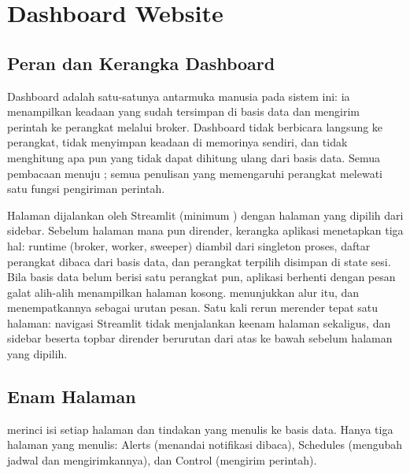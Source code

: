 \chapter{Dashboard Website}
\label{ch:05-website}

\section{Peran dan Kerangka Dashboard}

Dashboard adalah satu-satunya antarmuka manusia pada sistem ini: ia menampilkan
keadaan yang sudah tersimpan di basis data dan mengirim perintah ke perangkat
melalui broker. Dashboard tidak berbicara langsung ke perangkat, tidak menyimpan
keadaan di memorinya sendiri, dan tidak menghitung apa pun yang tidak dapat
dihitung ulang dari basis data. Semua pembacaan menuju \code{\DbFile}; semua
penulisan yang memengaruhi perangkat melewati satu fungsi pengiriman perintah.

Halaman dijalankan oleh Streamlit \StreamlitVersion{} (minimum \StreamlitMin)
dengan \NumPages{} halaman yang dipilih dari sidebar. Sebelum halaman mana pun
dirender, kerangka aplikasi menetapkan tiga hal: runtime (broker, worker, sweeper)
diambil dari singleton proses, daftar perangkat dibaca dari basis data, dan
perangkat terpilih disimpan di state sesi. Bila basis data belum berisi satu
perangkat pun, aplikasi berhenti dengan pesan galat alih-alih menampilkan halaman
kosong.  menunjukkan alur itu, dan
 menempatkannya sebagai urutan pesan. Satu kali rerun
merender tepat satu halaman: navigasi Streamlit tidak menjalankan keenam halaman
sekaligus, dan sidebar beserta topbar dirender berurutan dari atas ke bawah sebelum
halaman yang dipilih.



\section{Enam Halaman}

 merinci isi setiap halaman dan tindakan yang menulis ke
basis data. Hanya tiga halaman yang menulis: Alerts (menandai notifikasi dibaca),
Schedules (mengubah jadwal dan mengirimkannya), dan Control (mengirim perintah).

